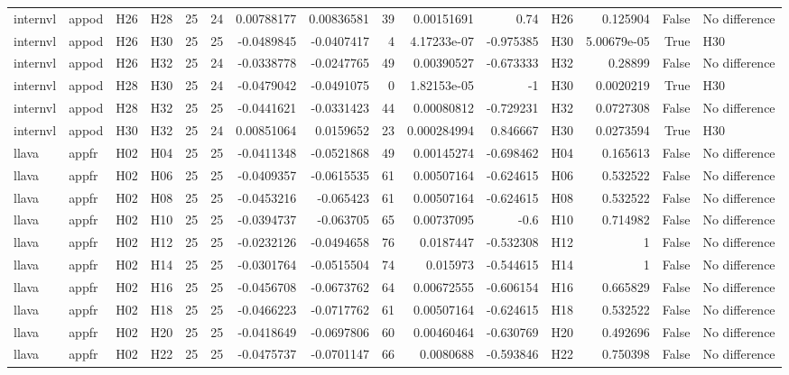 \begin{longtable}{llllrrrrrrrlrrl}
internvl & appod & H26 & H28 & 25 & 24 & 0.00788177 & 0.00836581 & 39 & 0.00151691 & 0.74 & H26 & 0.125904 & False & No difference \\
internvl & appod & H26 & H30 & 25 & 25 & -0.0489845 & -0.0407417 & 4 & 4.17233e-07 & -0.975385 & H30 & 5.00679e-05 & True & H30 \\
internvl & appod & H26 & H32 & 25 & 24 & -0.0338778 & -0.0247765 & 49 & 0.00390527 & -0.673333 & H32 & 0.28899 & False & No difference \\
internvl & appod & H28 & H30 & 25 & 24 & -0.0479042 & -0.0491075 & 0 & 1.82153e-05 & -1 & H30 & 0.0020219 & True & H30 \\
internvl & appod & H28 & H32 & 25 & 25 & -0.0441621 & -0.0331423 & 44 & 0.00080812 & -0.729231 & H32 & 0.0727308 & False & No difference \\
internvl & appod & H30 & H32 & 25 & 24 & 0.00851064 & 0.0159652 & 23 & 0.000284994 & 0.846667 & H30 & 0.0273594 & True & H30 \\
llava & appfr & H02 & H04 & 25 & 25 & -0.0411348 & -0.0521868 & 49 & 0.00145274 & -0.698462 & H04 & 0.165613 & False & No difference \\
llava & appfr & H02 & H06 & 25 & 25 & -0.0409357 & -0.0615535 & 61 & 0.00507164 & -0.624615 & H06 & 0.532522 & False & No difference \\
llava & appfr & H02 & H08 & 25 & 25 & -0.0453216 & -0.065423 & 61 & 0.00507164 & -0.624615 & H08 & 0.532522 & False & No difference \\
llava & appfr & H02 & H10 & 25 & 25 & -0.0394737 & -0.063705 & 65 & 0.00737095 & -0.6 & H10 & 0.714982 & False & No difference \\
llava & appfr & H02 & H12 & 25 & 25 & -0.0232126 & -0.0494658 & 76 & 0.0187447 & -0.532308 & H12 & 1 & False & No difference \\
llava & appfr & H02 & H14 & 25 & 25 & -0.0301764 & -0.0515504 & 74 & 0.015973 & -0.544615 & H14 & 1 & False & No difference \\
llava & appfr & H02 & H16 & 25 & 25 & -0.0456708 & -0.0673762 & 64 & 0.00672555 & -0.606154 & H16 & 0.665829 & False & No difference \\
llava & appfr & H02 & H18 & 25 & 25 & -0.0466223 & -0.0717762 & 61 & 0.00507164 & -0.624615 & H18 & 0.532522 & False & No difference \\
llava & appfr & H02 & H20 & 25 & 25 & -0.0418649 & -0.0697806 & 60 & 0.00460464 & -0.630769 & H20 & 0.492696 & False & No difference \\
llava & appfr & H02 & H22 & 25 & 25 & -0.0475737 & -0.0701147 & 66 & 0.0080688 & -0.593846 & H22 & 0.750398 & False & No difference \\

\end{longtable}
